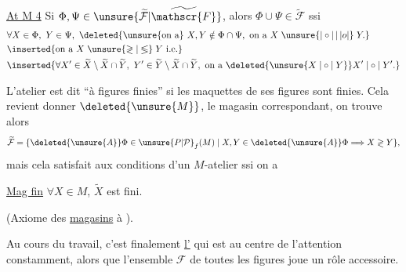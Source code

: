 \uline{At M 4} Si $\Phi,\Psi\in\unsure{\widetilde{\mathcal{F}}|\widetilde{\mathscr{F}}}$, alors $\Phi\cup\Psi\in\widetilde{\mathcal{F}}$ ssi
\[
\begin{aligned}
&\forall X\in\Phi,\ Y\in\Psi,\ \deleted{\unsure{\text{on a}}\ X,Y\notin\Phi\cap\Psi,\ \text{on a }X\mathrel{\unsure{|\circ|\,|\,|o|}}Y.}\\
&\inserted{\text{on a }X\mathrel{\unsure{\gtrless|\lessgtr}}Y\ \text{i.e.}}\\
&\inserted{\forall X'\in\widetilde{X}\setminus\widetilde{X}\cap\widetilde{Y},\ Y'\in\widetilde{Y}\setminus\widetilde{X}\cap\widetilde{Y},\ \text{on a }\deleted{\unsure{X\mathrel{|\circ|}Y}}X'\mathrel{|\circ|}Y'.}
\end{aligned}
\]

L'atelier est dit  ``à figures finies'' si les maquettes de ses figures sont finies. Cela revient   donner $\deleted{\unsure{M}}$, le magasin correspondant, on trouve alors
\[
\widetilde{\mathcal{F}}=\{\deleted{\unsure{A}}\Phi\in\unsure{P|\mathcal{P}}_{f}(M)\mid X,Y\in\deleted{\unsure{A}}\Phi\Longrightarrow X\mathrel{\gtrless}Y\},
\]
mais  cela satisfait aux conditions d'un $M$-atelier ssi on a

\par
\uline{Mag fin} $\forall X\in M$, $\widetilde{X}$ est fini.

(Axiome des \uline{magasins} à ).

Au cours du travail,  c'est finalement \uline{l'} qui est au centre de l'attention constamment, alors que l'ensemble $\mathcal{F}$ de toutes les figures joue un rôle  accessoire.
